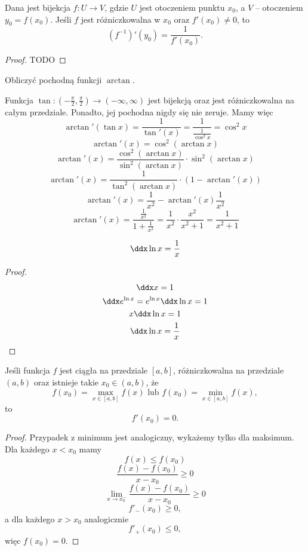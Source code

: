 \begin{theorem}
    Dana jest bijekcja $f: U \to V$, gdzie $U$ jest otoczeniem punktu $x_0$, a $V$ -- otoczeniem $y_0 = f(x_0)$. Jeśli $f$ jest różniczkowalna w $x_0$ oraz $f'(x_0) \neq 0$, to
    \[ \left(f^{-1}\right)'(y_0) = \frac{1}{f'(x_0)}. \]
\end{theorem}
\begin{proof}
    TODO
\end{proof}

\begin{example}
    Obliczyć pochodną funkcji $\arctan$.
\end{example}
\begin{solution}
    Funkcja $\tan : (-\frac{\pi}{2}, \frac{\pi}{2}) \to (-\infty, \infty)$ jest bijekcją oraz jest różniczkowalna na całym przedziale. Ponadto, jej pochodna nigdy się nie zeruje. Mamy więc
    \[ \arctan'(\tan x) = \frac{1}{\tan'(x)} = \frac{1}{\frac{1}{\cos^2 x}} = \cos^2 x \]
    \[ \arctan'(x) = \cos^2(\arctan x) \]
    \[ \arctan'(x) = \frac{\cos^2(\arctan x)}{\sin^2(\arctan x)} \cdot \sin^2(\arctan x) \]
    \[ \arctan'(x) = \frac{1}{\tan^2(\arctan x)} \cdot (1 - \arctan'(x)) \]
    \[ \arctan'(x) = \frac{1}{x^2} - \arctan'(x)\frac{1}{x^2} \]
    \[ \arctan'(x) = \frac{\frac{1}{x^2}}{1 + \frac{1}{x^2}} = \frac{1}{x^2}\cdot\frac{x^2}{x^2 + 1} = \frac{1}{x^2 + 1} \]
\end{solution}

\begin{theorem}
    \[ \ddx \ln x = \frac{1}{x} \]
\end{theorem}
\begin{proof}
    \begin{gather*}
        \ddx x = 1 \\
        \ddx e^{\ln x} = e^{\ln x} \ddx \ln x = 1 \\
        x \ddx \ln x = 1 \\
        \ddx \ln x = \frac{1}{x}
    \end{gather*}
\end{proof}

\begin{theorem}
    \label{t:zero derivative in extremum}
    Jeśli funkcja $f$ jest ciągła na przedziale $[a, b]$, różniczkowalna na przedziale $(a, b)$ oraz istnieje takie $x_0 \in (a, b)$, że
    \[ f(x_0) = \max_{x \in [a, b]} f(x) \text{ lub } f(x_0) = \min_{x \in [a, b]} f(x), \]
    to
    \[ f'(x_0) = 0. \]
\end{theorem}
\begin{proof}
    Przypadek z minimum jest analogiczny, wykażemy tylko dla maksimum. Dla każdego $x < x_0$ mamy
    \[ f(x) \leq f(x_0) \]
    \[ \frac{f(x) - f(x_0)}{x - x_0} \geq 0 \]
    \[ \lim_{x\to x_0^-}\frac{f(x) - f(x_0)}{x - x_0} \geq 0 \]
    \[ f'_-(x_0) \geq 0, \]
    a dla każdego $x > x_0$ analogicznie
    \[ f'_+(x_0) \leq 0, \]
    więc $f(x_0) = 0$.
\end{proof}

